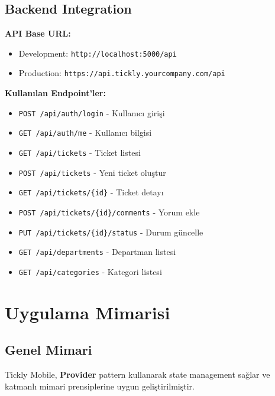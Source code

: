 \documentclass[12pt,a4paper]{article}
\begin{document}
\subsection{Backend Integration}

\textbf{API Base URL:}
\begin{itemize}
    \item Development: \texttt{http://localhost:5000/api}
    \item Production: \texttt{https://api.tickly.yourcompany.com/api}
\end{itemize}

\textbf{Kullanılan Endpoint'ler:}
\begin{itemize}
    \item \texttt{POST /api/auth/login} - Kullanıcı girişi
    \item \texttt{GET /api/auth/me} - Kullanıcı bilgisi
    \item \texttt{GET /api/tickets} - Ticket listesi
    \item \texttt{POST /api/tickets} - Yeni ticket oluştur
    \item \texttt{GET /api/tickets/\{id\}} - Ticket detayı
    \item \texttt{POST /api/tickets/\{id\}/comments} - Yorum ekle
    \item \texttt{PUT /api/tickets/\{id\}/status} - Durum güncelle
    \item \texttt{GET /api/departments} - Departman listesi
    \item \texttt{GET /api/categories} - Kategori listesi
\end{itemize}

\newpage

\section{Uygulama Mimarisi}

\subsection{Genel Mimari}

Tickly Mobile, \textbf{Provider} pattern kullanarak state management sağlar ve katmanlı mimari prensiplerine uygun geliştirilmiştir.
\end{document}
